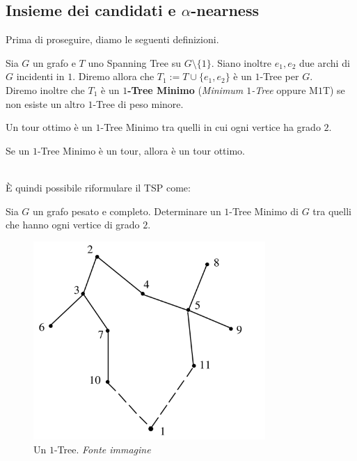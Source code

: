 \subsection{Insieme dei candidati e $\alpha$-nearness}

Prima di proseguire, diamo le seguenti definizioni.
\begin{definition}
    Sia $G$ un grafo e $T$ uno Spanning Tree su $G\setminus{}\{1\}$. Siano inoltre $e_1, e_2$ due archi 
    di $G$ incidenti in $1$. Diremo allora che $T_1 := T\cup{}\{e_1, e_2\}$ è un $1$-Tree per $G$.\\
    Diremo inoltre che $T_1$ è un \textbf{$1$-Tree Minimo} (\textit{Minimum $1$-Tree} oppure M$1$T) se non 
    esiste un altro $1$-Tree di peso minore.
\end{definition}

\begin{observation}
    Un tour ottimo è un $1$-Tree Minimo tra quelli in cui ogni vertice ha grado $2$.
\end{observation}

\begin{observation}
    Se un $1$-Tree Minimo è un tour, allora è un tour ottimo.
\end{observation}
\ \\
È quindi possibile riformulare il TSP come:
\begin{definition}
    Sia $G$ un grafo pesato e completo. Determinare un $1$-Tree Minimo di $G$ tra quelli che hanno ogni vertice 
    di grado $2$.
\end{definition}

\begin{figure}[H]
    \centering
    \includegraphics[width=250pt]{img/1Tree.png}
    \caption{Un $1$-Tree. \textit{Fonte immagine \cite{LKH}}}
\end{figure}

